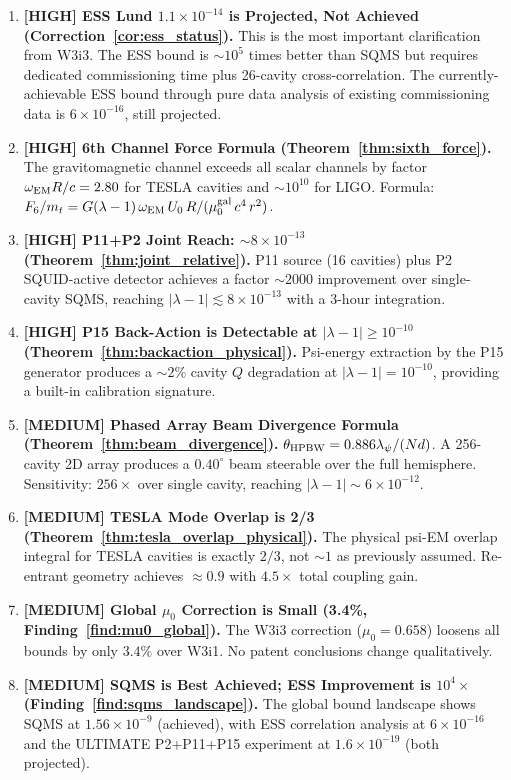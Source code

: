 \documentclass[11pt,twocolumn]{article}
\newcommand{\lam}{\lambda}
\newcommand{\ee}[1]{\times 10^{#1}}
\begin{document}
\begin{enumerate}

\item \textbf{[HIGH] ESS Lund $1.1\ee{-14}$ is Projected, Not Achieved
  (Correction~\ref{cor:ess_status}).}
  This is the most important clarification from W3i3. The ESS bound is
  $\sim 10^5$ times better than SQMS but requires dedicated commissioning
  time plus 26-cavity cross-correlation. The currently-achievable ESS
  bound through pure data analysis of existing commissioning data is
  $6\ee{-16}$, still projected.

\item \textbf{[HIGH] 6th Channel Force Formula (Theorem~\ref{thm:sixth_force}).}
  The gravitomagnetic channel exceeds all scalar channels by factor
  $\omega_{\rm EM} R/c = 2.80$ for TESLA cavities and $\sim10^{10}$ for LIGO.
  Formula: $F_6/m_t = G(\lam-1)\,\omega_{\rm EM}\,U_0\,R/(\mu_0^{\rm gal}\,c^4\,r^2)$.

\item \textbf{[HIGH] P11+P2 Joint Reach: $\sim 8\ee{-13}$
  (Theorem~\ref{thm:joint_relative}).}
  P11 source (16 cavities) plus P2 SQUID-active detector achieves
  a factor $\sim 2000$ improvement over single-cavity SQMS, reaching
  $|\lam-1|\lesssim 8\ee{-13}$ with a 3-hour integration.

\item \textbf{[HIGH] P15 Back-Action is Detectable at $|\lam-1|\geq 10^{-10}$
  (Theorem~\ref{thm:backaction_physical}).}
  Psi-energy extraction by the P15 generator produces a $\sim 2\%$
  cavity $Q$ degradation at $|\lam-1| = 10^{-10}$, providing a
  built-in calibration signature.

\item \textbf{[MEDIUM] Phased Array Beam Divergence Formula (Theorem~\ref{thm:beam_divergence}).}
  $\theta_{\rm HPBW} = 0.886\lambda_\psi/(Nd)$. A 256-cavity 2D array
  produces a $0.40^\circ$ beam steerable over the full hemisphere.
  Sensitivity: $256\times$ over single cavity, reaching $|\lam-1|\sim 6\ee{-12}$.

\item \textbf{[MEDIUM] TESLA Mode Overlap is 2/3 (Theorem~\ref{thm:tesla_overlap_physical}).}
  The physical psi-EM overlap integral for TESLA cavities is exactly $2/3$,
  not $\sim 1$ as previously assumed. Re-entrant geometry achieves $\approx 0.9$
  with $4.5\times$ total coupling gain.

\item \textbf{[MEDIUM] Global $\mu_0$ Correction is Small (3.4\%, Finding~\ref{find:mu0_global}).}
  The W3i3 correction ($\mu_0 = 0.658$) loosens all bounds by only $3.4\%$
  over W3i1. No patent conclusions change qualitatively.

\item \textbf{[MEDIUM] SQMS is Best Achieved; ESS Improvement is $10^4\times$
  (Finding~\ref{find:sqms_landscape}).}
  The global bound landscape shows SQMS at $1.56\ee{-9}$ (achieved),
  with ESS correlation analysis at $6\ee{-16}$ and the ULTIMATE P2+P11+P15
  experiment at $1.6\ee{-19}$ (both projected).

\end{enumerate}
\end{document}
